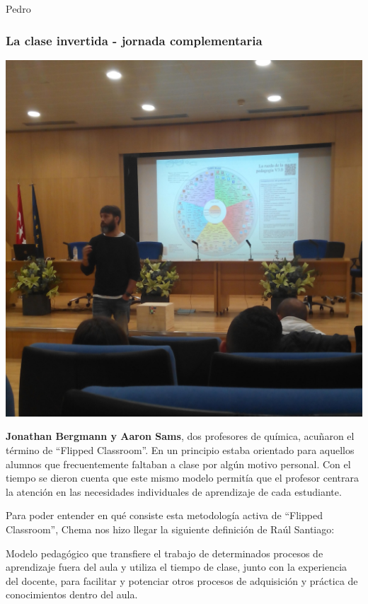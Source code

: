 \begin{opin}{\pedrocolor}{Pedro}

\subsubsection{La clase invertida - jornada complementaria}
\begin{minipage}[hbtp]{1.0\linewidth}
\centering
\includegraphics[scale=0.12]{img/pedron.jpg}
\end{minipage}

\textbf{Jonathan Bergmann y Aaron Sams}, dos profesores de química, acuñaron el término de “Flipped Classroom”. En un principio estaba orientado para aquellos alumnos que frecuentemente faltaban a clase por algún motivo personal. Con el tiempo se dieron cuenta que este mismo modelo permitía que el profesor centrara la atención en las necesidades individuales de aprendizaje de cada estudiante.

Para poder entender en qué consiste esta metodología activa de “Flipped Classroom”, Chema nos hizo llegar la siguiente definición de Raúl Santiago:

Modelo pedagógico que transfiere el trabajo de determinados procesos de aprendizaje  fuera del aula y utiliza el tiempo de clase, junto con la experiencia del docente, para facilitar y potenciar otros procesos de adquisición y práctica de conocimientos dentro del aula. 


\end{opin}
